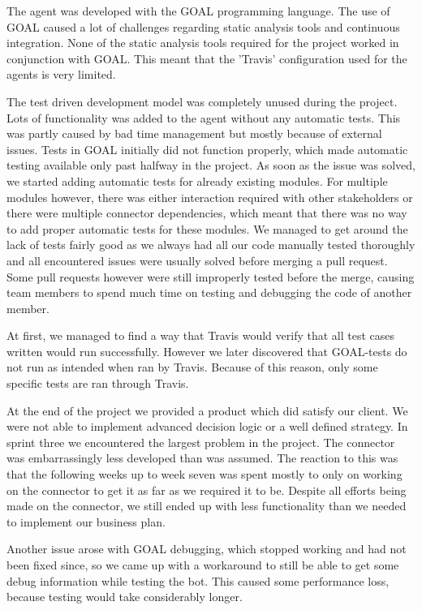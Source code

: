 The agent was developed with the GOAL programming language. The use of GOAL caused a lot of challenges regarding static analysis tools and continuous integration. None of the static analysis tools required for the project worked in conjunction with GOAL. This meant that the 'Travis' configuration used for the agents is very limited.

The test driven development model was completely unused during the project. Lots of functionality was added to the agent without any automatic tests. This was partly caused by bad time management but mostly because of external issues. Tests in GOAL initially did not function properly, which made automatic testing available only past halfway in the project. As soon as the issue was solved, we started adding automatic tests for already existing modules. For multiple modules however, there was either interaction required with other stakeholders or there were multiple connector dependencies, which meant that there was no way to add proper automatic tests for these modules. We managed to get around the lack of tests fairly good as we always had all our code manually tested thoroughly and all encountered issues were usually solved before merging a pull request. Some pull requests however were still improperly tested before the merge, causing team members to spend much time on testing and debugging the code of another member. 

At first, we managed to find a way that Travis would verify that all test cases written would run successfully. However we later discovered that GOAL-tests do not run as intended when ran by Travis. 
Because of this reason, only some specific tests are ran through Travis. 

At the end of the project we provided a product which did satisfy our client. We were not able to implement advanced decision logic or a well defined strategy. 
In sprint three we encountered the largest problem in the project. The connector was embarrassingly less developed than was assumed. The reaction to this was that the following weeks up to week seven was spent mostly to only on working on the connector to get it as far as we required it to be. Despite all efforts being made on the connector, we still ended up with less functionality than we needed to implement our business plan. 

Another issue arose with GOAL debugging, which stopped working and had not been fixed since, so we came up with a workaround to still be able to get some debug information while testing the bot. This caused some performance loss, because testing would take considerably longer.


